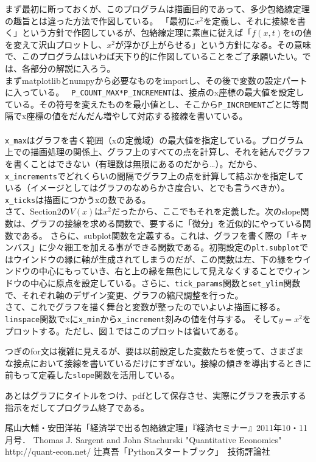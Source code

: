 \documentclass[11pt,a4j,fleqn]{jarticle}
\begin{document}
まず最初に断っておくが、このプログラムは描画目的であって、多少包絡線定理の趣旨とは違った方法で作図している。
「最初に$x^2$を定義し、それに接線を書く」という方針で作図しているが、包絡線定理に素直に従えば「$f(x,t)$をtの値を変えて沢山プロットし、$x^2$が浮かび上がらせる」という方針になる。その意味で、このプログラムはいわば天下り的に作図していることをご了承願いたい。では、各部分の解説に入ろう。\\


まずmatplotlibとnumpyから必要なものをimportし、その後で変数の設定パートに入っている。
\verb! P_COUNT_MAX*P_INCREMENT!は、接点のx座標の最大値を設定している。その符号を変えたものを最小値とし、そこから\verb!P_INCREMENT!ごとに等間隔でx座標の値をだんだん増やして対応する接線を書いている。\\
\\\verb!x_max!はグラフを書く範囲（xの定義域）の最大値を指定している。プログラム上での描画処理の関係上、グラフ上のすべての点を計算し、それを結んでグラフを書くことはできない（有理数は無限にあるのだから…）。だから、\verb!x_increments!でどれくらいの間隔でグラフ上の点を計算して結ぶかを指定している（イメージとしてはグラフのなめらかさ度合い、とでも言うべきか）。\verb!x_ticks!は描画につかうxの数である。\\

さて、Section2の$V(x)$は$x^2$だったから、ここでもそれを定義した。次のslope関数は、グラフの接線を求める関数で、要するに「微分」を近似的にやっている関数である。
さらに、subplot関数を定義する。これは、グラフを書く際の「キャンバス」に少々細工を加える事ができる関数である。初期設定の\verb!plt.subplot!ではウインドウの縁に軸が生成されてしまうのだが、この関数は左、下の縁をウインドウの中心にもっていき、右と上の縁を無色にして見えなくすることでウィンドウの中心に原点を設定している。さらに、\verb!tick_params!関数と\verb!set_ylim!関数で、それぞれ軸のデザイン変更、グラフの縮尺調整を行った。\\

さて、これでグラフを描く舞台と変数が整ったのでいよいよ描画に移る。\verb!linspace!関数でxに\verb!x_min!から\verb!x_increment!刻みの値を付与する。
そして$y=x^2$をプロットする。ただし、図１ではこのプロットは省いてある。

つぎのfor文は複雑に見えるが、要は以前設定した変数たちを使って、さまざまな接点において接線を書いているだけにすぎない。接線の傾きを導出するときに前もって定義した\verb!slope!関数を活用している。

あとはグラフにタイトルをつけ、pdfとして保存させ、実際にグラフを表示する指示をだしてプログラム終了である。
\begin{thebibliography}{0}
尾山大輔・安田洋祐「経済学で出る包絡線定理」『経済セミナー』2011年10・11月号．
Thomas J. Sargent and John Stachurski "Quantitative Economics" http://quant-econ.net/
辻真吾「Pythonスタートブック」　技術評論社
\end{thebibliography}
\end{document}
